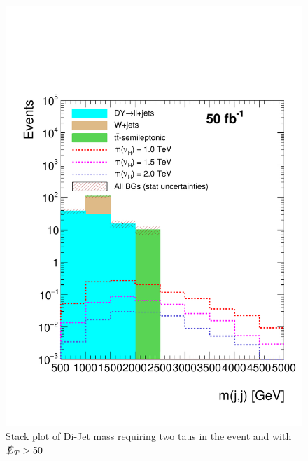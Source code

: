\begin{figure}[H]
\centering
\includegraphics[width=\linewidth]{StackPlots/mjj_2taus_met50_50ifb.pdf}
\caption{Stack plot of Di-Jet mass requiring two taus in the event and with $\slashed{E}_{T} > 50$}
\label{fig: mjj2tausMet50}
\end{figure}

